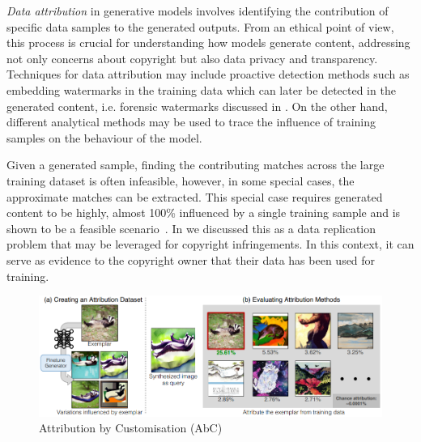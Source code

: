 \documentclass[conference,table]{IEEEtran} %
\begin{document}
\textit{Data attribution} in generative models involves identifying the contribution of specific data samples to the generated outputs. 
From an ethical point of view, this process is crucial for understanding how models generate content, addressing not only concerns about copyright but also data privacy and transparency. 
Techniques for data attribution may include proactive detection methods such as embedding watermarks in the training data which can later be detected in the generated content, i.e. forensic watermarks discussed in . 
On the other hand, different analytical methods may be used to trace the influence of training samples on the behaviour of the model. 


Given a generated sample, finding the contributing matches across the large training dataset is often infeasible, however, in some special cases, the approximate matches can be extracted.
This special case requires generated content to be highly, almost 100\% influenced by a single training sample and is shown to be a feasible scenario~\cite{carlini_extracting_2023,somepalli_diffusion_2022}. 
In  we discussed this as a data replication problem that may be leveraged for copyright infringements. 
In this context, it can serve as evidence to the copyright owner that their data has been used for training. 

\begin{figure}
    \centering
    \includegraphics[width=\linewidth]{figures/attribution.PNG}
    \caption{Attribution by Customisation (AbC)~\cite{wang_evaluating_2023}}
    \label{fig:attribution}
\end{figure}
\end{document}
